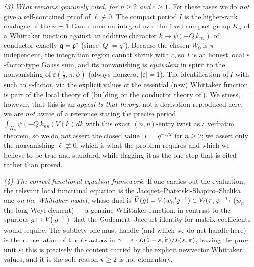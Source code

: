 \smallskip
\noindent\emph{(3) What remains genuinely cited, for $n\ge2$ and $c\ge1$.} For these cases we do
\emph{not} give a self-contained proof of $\ell\not\equiv0$. The compact period $I$ is the
higher-rank analogue of the $n=1$ Gauss sum: an integral over the fixed compact group $K_n$ of a
Whittaker function against an additive character $k\mapsto\psi(-Q\,k_{nn})$ of conductor exactly
$\mathfrak{q}=\mathfrak{p}^{c}$ \textup{(}since $|Q|=q^{c}$\textup{)}. Because the chosen $W_0$ is
$\pi$-independent, the integration region cannot shrink with $c$, so $I$ is an honest local
$\varepsilon$-factor-type Gauss sum, and its nonvanishing is \emph{equivalent} in spirit to the
nonvanishing of $\varepsilon(\tfrac12,\pi,\psi)$ \textup{(}always nonzero, $|\varepsilon|=1$\textup{)}.
The identification of $I$ with such an $\varepsilon$-factor, via the explicit values of the
essential \textup{(}new\textup{)} Whittaker function, is part of the local theory of
\cite{Matringe} \textup{(}building on the conductor theory of \cite{JPSS81}\textup{)}. We stress,
however, that this is an \emph{appeal to that theory}, not a derivation reproduced here: we are
\emph{not} aware of a reference stating the precise period $\int_{K_n}\psi(-Q\,k_{nn})V(k)\,dk$ with
this exact $(n,n)$-entry twist as a verbatim theorem, so we do \emph{not} assert the closed value
$|I|=q^{-c/2}$ for $n\ge2$; we assert only the nonvanishing $\ell\not\equiv0$, which is what the
problem requires and which we believe to be true and standard, while flagging it as the one step
that is cited rather than proved.

\smallskip
\noindent\emph{(4) The correct functional-equation framework.} If one carries out the evaluation,
the relevant local functional equation is the Jacquet--Piatetski-Shapiro--Shalika one
\emph{on the Whittaker model}, whose dual is $\widetilde{V}(g)=V(w_n{}^{t}g^{-1})\in
\mathcal{W}(\widetilde{\pi},\psi^{-1})$ \textup{(}$w_n$ the long Weyl element\textup{)} --- a genuine
Whittaker function, in contrast to the spurious $g\mapsto V(g^{-1})$ that the Godement--Jacquet
identity for matrix coefficients would require. The subtlety one must handle \textup{(}and which we
do not handle here\textup{)} is the cancellation of the $L$-factors in
$\gamma=\varepsilon\cdot L(1-s,\widetilde{\pi})/L(s,\pi)$, leaving the pure unit $\varepsilon$\textup{;}
this is precisely the content carried by the explicit newvector Whittaker values, and it is the sole
reason $n\ge2$ is not elementary.

